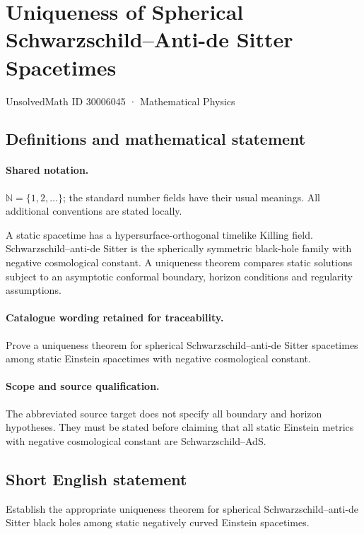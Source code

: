 \documentclass[11pt]{article}
\begin{document}
\setcounter{section}{30006044}
\section{Uniqueness of Spherical Schwarzschild–Anti-de Sitter Spacetimes}\label{30006045}
{\small UnsolvedMath ID 30006045 · Mathematical Physics}
\subsection{Definitions and mathematical statement}

\paragraph{Shared notation.}$\mathbb N=\{1,2,\ldots\}$; the standard number fields have their usual meanings. All additional conventions are stated locally.


A static spacetime has a hypersurface-orthogonal timelike Killing field. Schwarzschild--anti-de Sitter is the spherically symmetric black-hole family with negative cosmological constant. A uniqueness theorem compares static solutions subject to an asymptotic conformal boundary, horizon conditions and regularity assumptions.

\paragraph{Catalogue wording retained for traceability.}
Prove a uniqueness theorem for spherical Schwarzschild–anti-de Sitter spacetimes among static Einstein spacetimes with negative cosmological constant.

\paragraph{Scope and source qualification.}The abbreviated source target does not specify all boundary and horizon hypotheses. They must be stated before claiming that all static Einstein metrics with negative cosmological constant are Schwarzschild--AdS.
\subsection{Short English statement}
Establish the appropriate uniqueness theorem for spherical Schwarzschild--anti-de Sitter black holes among static negatively curved Einstein spacetimes.
\end{document}
